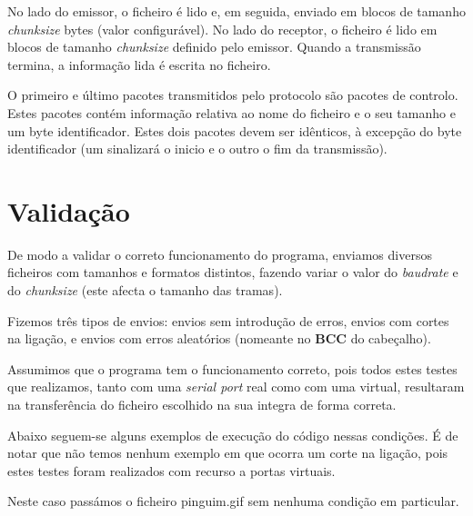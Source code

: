 \documentclass[11pt]{report}
\begin{document}
No lado do emissor, o ficheiro é lido e, em seguida, enviado em blocos de
tamanho \textit{chunksize} bytes (valor configurável). No lado do receptor, o
ficheiro é lido em blocos de tamanho \textit{chunksize} definido pelo emissor.
Quando a transmissão termina, a informação lida é escrita no ficheiro.

O primeiro e último pacotes transmitidos pelo protocolo são pacotes de controlo.
Estes pacotes contém informação relativa ao nome do ficheiro e o seu tamanho e
um byte identificador. Estes dois pacotes devem ser idênticos, à excepção do byte
identificador (um sinalizará o inicio e o outro o fim da transmissão).

{\let\clearpage\relax \chapter{Validação}}

De modo a validar o correto funcionamento do programa, enviamos diversos ficheiros
com tamanhos e formatos distintos, fazendo variar o valor do \textit{baudrate}
e do \textit{chunksize} (este afecta o tamanho das tramas).

Fizemos três tipos de envios: envios sem introdução de erros, envios com cortes
na ligação, e envios com erros aleatórios (nomeante no \textbf{BCC} do cabeçalho).

Assumimos que o programa tem o funcionamento correto, pois todos estes testes
que realizamos, tanto com uma \textit{serial port} real como com uma virtual,
resultaram na transferência do ficheiro escolhido na sua integra de forma correta.

Abaixo seguem-se alguns exemplos de execução do código nessas condições. É de notar
que não temos nenhum exemplo em que ocorra um corte na ligação, pois estes testes
foram realizados com recurso a portas virtuais.

Neste caso passámos o ficheiro pinguim.gif sem nenhuma condição em particular.
\end{document}
